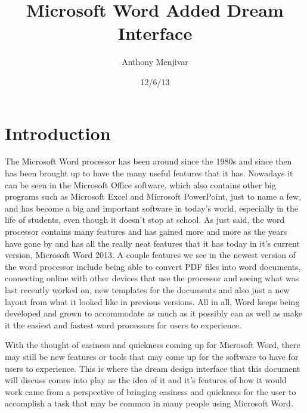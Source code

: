 \documentclass{article}
\title{Microsoft Word Added Dream Interface}
\author{Anthony Menjivar}
\date{12/6/13}
\begin{document}
\maketitle


\section{Introduction}	
\indent	The Microsoft Word processor has been around since the 1980s and since then has been brought up to have the many useful features that it has. Nowadays it can be seen in the Microsoft Office software, which also contains other big programs such as Microsoft Excel and Microsoft PowerPoint, just to name a few, and has become a big and important software in today's world, especially in the life of students, even though it doesn't stop at school. As just said, the word processor contains many features and has gained more and more as the years have gone by and has all the really neat features that it has today in it's current version, Microsoft Word 2013. A couple features we see in the newest version of the word processor include being able to convert PDF files into word documents, connecting online with other devices that use the processor and seeing what was last recently worked on, new templates for the documents and also just a new layout from what it looked like in previous versions. All in all, Word keeps being developed and grown to accommodate as much as it possibly can as well as make it the easiest and fastest word processors for users to experience.	

	With the thought of easiness and quickness coming up for Microsoft Word, there may still be new features or tools that may come up for the software to have for users to experience. This is where the dream design interface that this document will discuss comes into play as the idea of it and it's features of how it would work came from a perspective of bringing easiness and quickness for the user to accomplish a task that may be common in many people using Microsoft Word.
\end{document}
